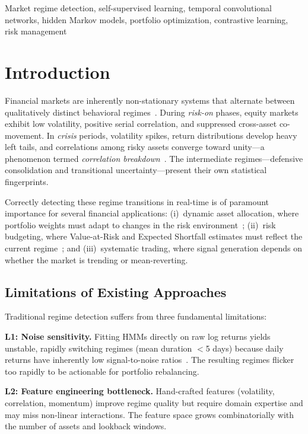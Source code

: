\documentclass[conference, twocolumn]{IEEEtran}
\begin{document}
\begin{IEEEkeywords}
Market regime detection, self-supervised learning, temporal convolutional networks, hidden Markov models, portfolio optimization, contrastive learning, risk management
\end{IEEEkeywords}

\section{Introduction}
\label{sec:intro}

Financial markets are inherently non-stationary systems that alternate between qualitatively distinct behavioral regimes~\cite{hamilton1989}. During \textit{risk-on} phases, equity markets exhibit low volatility, positive serial correlation, and suppressed cross-asset co-movement. In \textit{crisis} periods, volatility spikes, return distributions develop heavy left tails, and correlations among risky assets converge toward unity---a phenomenon termed \textit{correlation breakdown}~\cite{longin2001}. The intermediate regimes---defensive consolidation and transitional uncertainty---present their own statistical fingerprints.

Correctly detecting these regime transitions in real-time is of paramount importance for several financial applications: (i)~dynamic asset allocation, where portfolio weights must adapt to changes in the risk environment~\cite{nystrup2017}; (ii)~risk budgeting, where Value-at-Risk and Expected Shortfall estimates must reflect the current regime~\cite{rockafellar2000}; and (iii)~systematic trading, where signal generation depends on whether the market is trending or mean-reverting.

\subsection{Limitations of Existing Approaches}

Traditional regime detection suffers from three fundamental limitations:

\textbf{L1: Noise sensitivity.} Fitting HMMs directly on raw log returns yields unstable, rapidly switching regimes (mean duration $<$5 days) because daily returns have inherently low signal-to-noise ratios~\cite{bulla2006}. The resulting regimes flicker too rapidly to be actionable for portfolio rebalancing.

\textbf{L2: Feature engineering bottleneck.} Hand-crafted features (volatility, correlation, momentum) improve regime quality but require domain expertise and may miss non-linear interactions. The feature space grows combinatorially with the number of assets and lookback windows.
\end{document}
